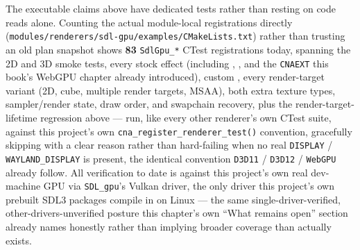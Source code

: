 The executable claims above have dedicated tests rather than resting on code reads alone.
Counting the actual module-local registrations directly
(\texttt{modules/renderers/sdl-gpu/\allowbreak{}examples/CMakeLists.txt}) rather than trusting an old plan
snapshot shows \textbf{83} \texttt{SdlGpu\_*} CTest registrations today, spanning the 2D and 3D
smoke tests, every stock effect (including ,
, and the \texttt{CNAEXT}  this book's WebGPU chapter
already introduced), custom , every render-target variant (2D, cube,
multiple render targets, MSAA), both extra texture types, sampler/render state, draw order, and
swapchain recovery, plus the render-target-lifetime regression above --- run, like every other renderer's own CTest suite, against this project's
own \texttt{cna\_register\_renderer\_test()} convention, gracefully skipping with a clear reason
rather than hard-failing when no real \texttt{DISPLAY} / \texttt{WAYLAND\_DISPLAY} is present, the
identical convention \texttt{D3D11} / \texttt{D3D12} / \texttt{WebGPU} already follow. All verification
to date is against this project's own real dev-machine GPU via \texttt{SDL\_gpu}'s Vulkan
driver, the only driver this project's own prebuilt SDL3 packages compile in on Linux --- the
same single-driver-verified, other-drivers-unverified posture this chapter's own ``What remains
open'' section already names honestly rather than implying broader coverage than actually
exists.
